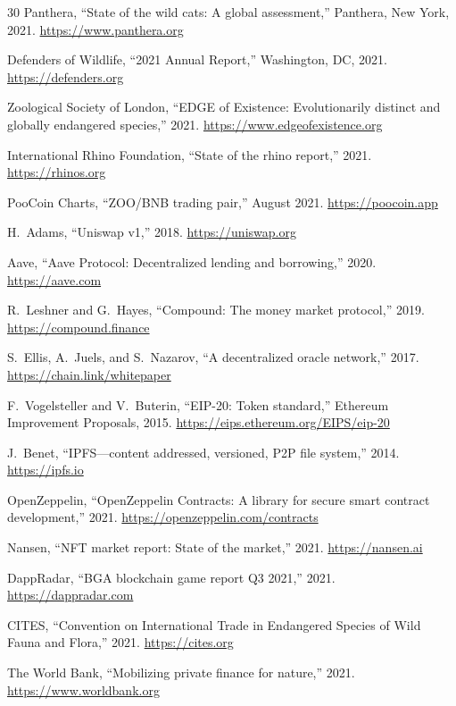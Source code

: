 \documentclass[11pt,letterpaper]{article}
\begin{document}
\begin{thebibliography}{30}
Panthera, ``State of the wild cats: A global assessment,'' Panthera, New York, 2021.
\url{https://www.panthera.org}

Defenders of Wildlife, ``2021 Annual Report,'' Washington, DC, 2021.
\url{https://defenders.org}

Zoological Society of London, ``EDGE of Existence: Evolutionarily distinct and globally
endangered species,'' 2021. \url{https://www.edgeofexistence.org}

International Rhino Foundation, ``State of the rhino report,'' 2021.
\url{https://rhinos.org}

PooCoin Charts, ``ZOO/BNB trading pair,'' August 2021.
\url{https://poocoin.app}

H.~Adams, ``Uniswap v1,'' 2018. \url{https://uniswap.org}

Aave, ``Aave Protocol: Decentralized lending and borrowing,'' 2020.
\url{https://aave.com}

R.~Leshner and G.~Hayes, ``Compound: The money market protocol,''
2019. \url{https://compound.finance}

S.~Ellis, A.~Juels, and S.~Nazarov, ``A decentralized oracle network,'' 2017.
\url{https://chain.link/whitepaper}

F.~Vogelsteller and V.~Buterin, ``EIP-20: Token standard,'' Ethereum Improvement
Proposals, 2015. \url{https://eips.ethereum.org/EIPS/eip-20}

J.~Benet, ``IPFS---content addressed, versioned, P2P file system,'' 2014.
\url{https://ipfs.io}

OpenZeppelin, ``OpenZeppelin Contracts: A library for secure smart contract development,''
2021. \url{https://openzeppelin.com/contracts}

Nansen, ``NFT market report: State of the market,'' 2021.
\url{https://nansen.ai}

DappRadar, ``BGA blockchain game report Q3 2021,'' 2021.
\url{https://dappradar.com}

CITES, ``Convention on International Trade in Endangered Species of Wild Fauna and
Flora,'' 2021. \url{https://cites.org}

The World Bank, ``Mobilizing private finance for nature,'' 2021.
\url{https://www.worldbank.org}

\end{thebibliography}
\end{document}
